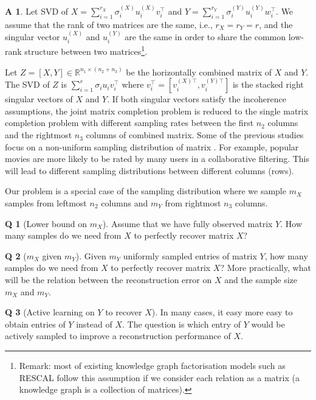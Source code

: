 \documentclass{article} %
\theoremstyle{definition}
\newtheorem{assumption}{A}
\newtheorem{question}{Q}
\begin{document}
\begin{assumption}\label{assume:share}
Let SVD of $X = \sum_{i=1}^{r_X} \sigma_i^{(X)} u_i^{(X)} v_i^\top$ and $Y = \sum_{i=1}^{r_Y} \sigma_i^{(Y)} u_i^{(Y)} w_i^\top$. We assume that the rank of two matrices are the same, i.e., $r_X = r_Y = r$, and the singular vector $u_i^{(X)}$ and $u_i^{(Y)}$ are the same in order to share the common low-rank structure between two matrices\footnote{Remark: most of existing knowledge graph factorisation models such as RESCAL follow this assumption if we consider each relation as a matrix (a knowledge graph is a collection of matrices).}.
\end{assumption}

Let $Z = [X, Y] \in \mathbb{R}^{n_1 \times (n_2+n_3)}$ be the horizontally combined matrix of $X$ and $Y$. The SVD of $Z$ is $\sum_{i=1}^{r}\sigma_i u_i v_i^\top$ where $v_i^\top = [v_i^{(X)\top}, v_i^{(Y)\top}]$ is the stacked right singular vectors of $X$ and $Y$. If both singular vectors satisfy the incoherence assumptions, the joint matrix completion problem is reduced to the single matrix completion problem with different sampling rates between the first $n_2$ columns and the rightmost $n_3$ columns of combined matrix. Some of the previous studies focus on a non-uniform sampling distribution of matrix \cite{foygel2011learning,lounici2011optimal,negahban2012restricted,klopp2014noisy}. For example, popular movies are more likely to be rated by many users in a collaborative filtering. This will lead to different sampling distributions between different columns (rows). 

Our problem is a special case of the sampling distribution where we sample $m_X$ samples from leftmost $n_2$ columns and $m_Y$ from rightmost $n_3$ columns.

\begin{question}[Lower bound on $m_X$]
Assume that we have fully observed matrix $Y$. How many samples do we need from $X$ to perfectly recover matrix $X$?
\end{question}

\begin{question}[$m_X$ given $m_Y$]
Given $m_Y$ uniformly sampled entries of matrix $Y$, how many samples do we need from $X$ to perfectly recover matrix $X$? More practically, what will be the relation between the reconstruction error on $X$ and the sample size $m_X$ and $m_Y$.
\end{question}

\begin{question}[Active learning on $Y$ to recover $X$]
In many cases, it easy more easy to obtain entries of $Y$ instead of $X$. The question is which entry of $Y$ would be actively sampled to improve a reconstruction performance of $X$.
\end{question}
\end{document}
